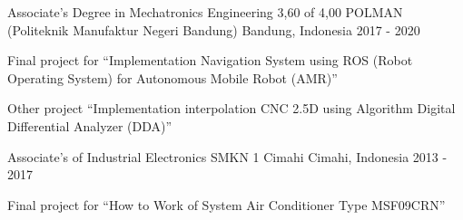 

\begin{cventries}

  \cventry
    {Associate's Degree in Mechatronics Engineering 3,60 of 4,00} %
    {POLMAN (Politeknik Manufaktur Negeri Bandung)} %
    {Bandung, Indonesia} %
    {2017 - 2020} %
    {
      \begin{cvitems} %
        \item {Final project for “Implementation Navigation System using ROS (Robot Operating System) for Autonomous Mobile Robot (AMR)”}
        \item {Other project “Implementation interpolation CNC 2.5D using Algorithm Digital Differential Analyzer (DDA)”}
      \end{cvitems}
    }
    
  \cventry
    {Associate's of Industrial Electronics} %
    {SMKN 1 Cimahi} %
    {Cimahi, Indonesia} %
    {2013 - 2017} %
    {
      \begin{cvitems} %
        \item {Final project for “How to Work of System Air Conditioner Type MSF09CRN”}
      \end{cvitems}
    }

\end{cventries}
